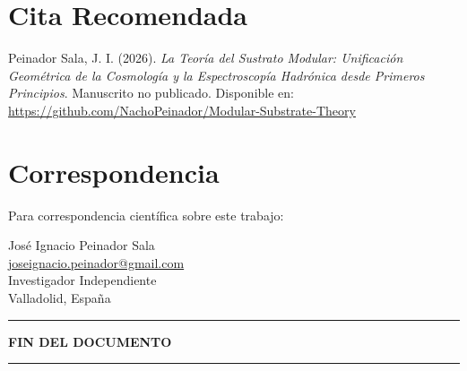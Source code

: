 \documentclass[11pt, a4paper]{article}
\theoremstyle{plain}
\theoremstyle{definition}
\begin{document}
\section*{Cita Recomendada}

Peinador Sala, J. I. (2026). \textit{La Teoría del Sustrato Modular: Unificación Geométrica de la Cosmología y la Espectroscopía Hadrónica desde Primeros Principios}. Manuscrito no publicado. Disponible en: \url{https://github.com/NachoPeinador/Modular-Substrate-Theory}

\section*{Correspondencia}

Para correspondencia científica sobre este trabajo:
\begin{center}
José Ignacio Peinador Sala \\
\href{mailto:joseignacio.peinador@gmail.com}{joseignacio.peinador@gmail.com} \\
Investigador Independiente \\
Valladolid, España
\end{center}

\vspace{1cm}

\begin{center}
\rule{0.8\textwidth}{0.5pt}

\textbf{FIN DEL DOCUMENTO}

\rule{0.8\textwidth}{0.5pt}
\end{center}
\end{document}
